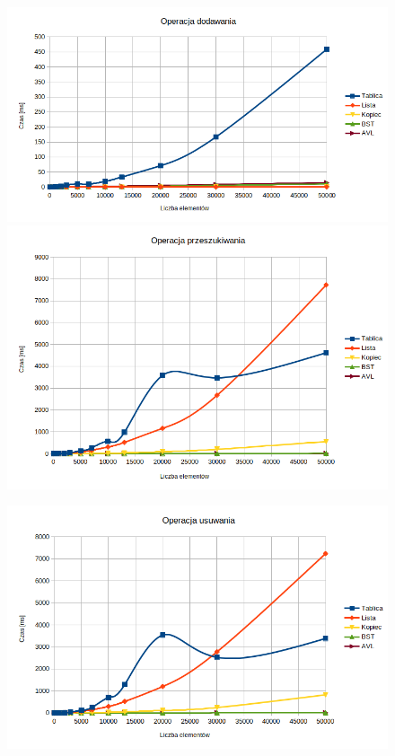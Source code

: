 \documentclass[10pt,a4paper,notitlepage]{article}
\begin{document}
	\begin{figure}
		\includegraphics[width=\linewidth]{Wyniki/dodawanie.png}
		\includegraphics[width=\linewidth]{Wyniki/przeszukiwanie.png}
	\end{figure}
	\begin{figure}
		\includegraphics[width=\linewidth]{Wyniki/usuwanie.png}
	\end{figure}
\end{document}
